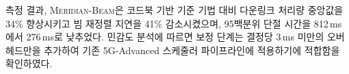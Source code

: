 \documentclass[12pt,a4paper]{report}
\begin{document}
\vspace{0.3cm}
\noindent 측정 결과, \textsc{Meridian-Beam}은 코드북 기반 기준 기법 대비
다운링크 처리량 중앙값을 34\% 향상시키고 빔 재정렬 지연을 41\% 감소시켰으며,
95백분위 단절 시간을 812\,ms에서 276\,ms로 낮추었다. 민감도 분석에 따르면
보정 단계는 결정당 3\,ms 미만의 오버헤드만을 추가하여 기존 5G-Advanced
스케줄러 파이프라인에 적용하기에 적합함을 확인하였다.

\clearpage

\tableofcontents
\clearpage
\listoftables
\clearpage
\listoffigures

\clearpage
{}
\setcounter{page}{1}















\end{document}
